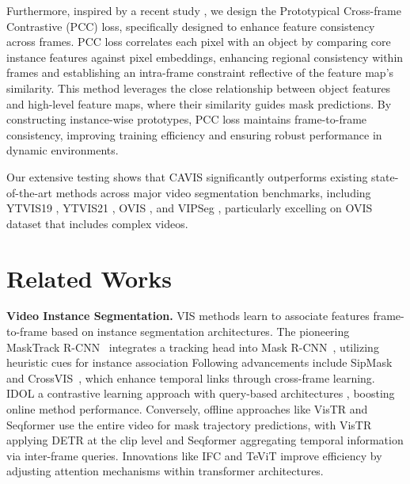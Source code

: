 \documentclass[10pt,twocolumn,letterpaper]{article}
\begin{document}
Furthermore, inspired by a recent study \citep{kim2025visage}, we design the Prototypical Cross-frame Contrastive (PCC) loss, specifically designed to enhance feature consistency across frames. PCC loss correlates each pixel with an object by comparing core instance features against pixel embeddings, enhancing regional consistency within frames and establishing an intra-frame constraint reflective of the feature map’s similarity. This method leverages the close relationship between object features and high-level feature maps, where their similarity guides mask predictions. By constructing instance-wise prototypes, PCC loss maintains frame-to-frame consistency, improving training efficiency and ensuring robust performance in dynamic environments.

Our extensive testing shows that CAVIS significantly outperforms existing state-of-the-art methods across major video segmentation benchmarks, including YTVIS19 \citep{yang2019video}, YTVIS21 \citep{vis2021}, OVIS \citep{qi2022occluded}, and VIPSeg \citep{miao2021vspw}, particularly excelling on OVIS dataset that includes complex videos.


\section{Related Works}

\textbf{Video Instance Segmentation.}
VIS methods learn to associate features frame-to-frame based on instance segmentation architectures. The pioneering MaskTrack R-CNN~\citep{yang2019video} integrates a tracking head into Mask R-CNN~\citep{he2017mask}, utilizing heuristic cues for instance association
Following advancements include SipMask~\citep{cao2020sipmask} and CrossVIS~\citep{yang2021crossover}, which enhance temporal links through cross-frame learning.
IDOL\citep{wu2022defense} a contrastive learning approach with query-based architectures \citep{zhu2020deformable}, boosting online method performance. 
Conversely, offline approaches like VisTR \citep{wang2021end} and Seqformer \citep{wu2022seqformer} use the entire video for mask trajectory predictions, with VisTR applying DETR \citep{carion2020end} at the clip level and Seqformer aggregating temporal information via inter-frame queries. 
Innovations like IFC \citep{hwang2021video} and TeViT \citep{yang2022temporally} improve efficiency by adjusting attention mechanisms within transformer architectures.
 
\end{document}
